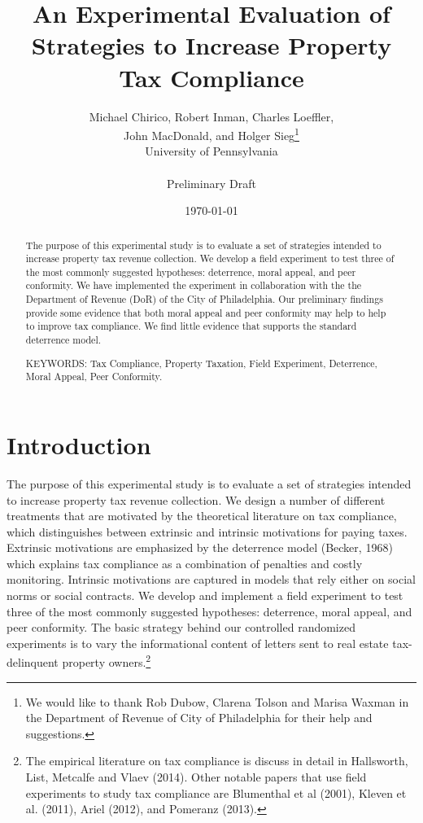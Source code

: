 \documentclass[12pt,titlepage]{article}
\renewcommand{\thefootnote}{\fnsymbol{footnote}}
\begin{document}
\title{An Experimental Evaluation of Strategies to Increase Property Tax Compliance}
\author{Michael Chirico, Robert Inman, Charles Loeffler, \\
John MacDonald, and Holger Sieg\thanks{We would like to thank  Rob Dubow, Clarena Tolson  and Marisa Waxman  in the 
Department of Revenue of City of Philadelphia for their help and suggestions.}
\\
University of Pennsylvania \\
\\
Preliminary Draft}
\date{\today}  
\maketitle

\begin{abstract}
The purpose of this experimental study is to evaluate a set of
strategies intended to increase property tax revenue
collection. We develop  a field experiment to test three of the most commonly
suggested hypotheses: deterrence, moral appeal, and peer conformity.
We have  implemented the experiment in collaboration with the the Department of Revenue (DoR) of the City
of Philadelphia. Our preliminary findings provide some evidence that both moral appeal
and peer conformity may help to help to improve tax compliance. We find
little evidence that supports the standard deterrence model.

\noindent KEYWORDS:  Tax Compliance, Property Taxation, Field Experiment, Deterrence, Moral Appeal, Peer Conformity.
\end{abstract}

\newpage

\renewcommand{\thefootnote}{\arabic{footnote}}

\renewcommand{\thefootnote}{\arabic{footnote}}

\section{Introduction}

The purpose of this experimental study is to evaluate a set of
strategies intended to increase property tax revenue
collection.  We design a number of different treatments that are
motivated by the theoretical literature on tax compliance, which
distinguishes between extrinsic and intrinsic motivations for paying
taxes. Extrinsic motivations are emphasized by the deterrence
model (Becker, 1968) which explains tax compliance as a combination of penalties and
costly monitoring. Intrinsic motivations are captured in models that
rely either on social norms or social contracts.  We develop and
implement a field experiment to test three of the most commonly
suggested hypotheses: deterrence, moral appeal, and peer conformity.
The basic strategy behind our controlled randomized experiments is to
vary the informational content of letters sent to real
estate tax-delinquent property owners.\footnote{The empirical literature on tax compliance 
is discuss in detail in Hallsworth, List, Metcalfe and Vlaev (2014). 
Other  notable papers that use field experiments to study tax compliance are 
Blumenthal et al (2001), Kleven et al. (2011), Ariel (2012), and Pomeranz (2013).}
\end{document}
